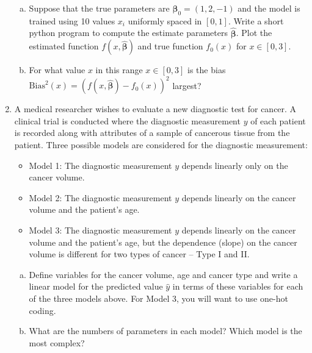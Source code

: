 \documentclass[11pt]{article}
\def\betabf{{\boldsymbol \beta}}
\def\betabfhat{{\widehat{\bm{\beta}}}}
\begin{document}
\begin{enumerate}
\begin{enumerate}[(a)]
\item
Suppose that the true parameters are $\betabf_0=(1,2,-1)$ and
the model is trained using 10 values $x_i$ uniformly spaced in $[0,1]$.
Write a short python program to compute the estimate parameters $\betabfhat$.
Plot the estimated function $f(x,\betabfhat)$ and true function $f_0(x)$
 for $x \in [0,3]$.

\item For what value $x$ in this range $x \in [0,3]$ is the bias
$\mathrm{Bias}^2(x) = (f(x,\betabfhat)-f_0(x))^2$ largest?
\end{enumerate}


\item A medical researcher wishes to evaluate a new diagnostic test for cancer.
A clinical trial is conducted where the diagnostic measurement $y$ of each patient is recorded along with
attributes of a sample of cancerous tissue from the patient.
Three possible models are considered for the diagnostic measurement:
\begin{itemize}
\item Model 1:  The diagnostic measurement $y$ depends linearly only on the cancer volume.
\item Model 2:  The diagnostic measurement $y$ depends linearly on the cancer volume and the patient's age.
\item Model 3:  The diagnostic measurement $y$ depends linearly on the cancer volume and the patient's age,
but the dependence (slope) on the cancer volume is different for two types of cancer -- Type I and II.
\end{itemize}


\begin{enumerate}[(a)]
  \item Define variables  for the cancer volume, age and cancer type and write a linear model
  for the predicted value $\hat{y}$ in terms of these variables for each of the three models above.
  For Model 3, you will want to use one-hot coding.
  
  \item What are the numbers of parameters in each model?  Which model is the most complex?


\end{enumerate}
\end{enumerate}
\end{document}
